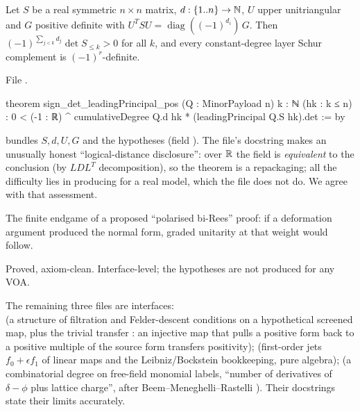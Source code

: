 \begin{theorem}\label{l19:thm:payload}
Let $S$ be a real symmetric $n\times n$ matrix, $d:\{1..n\}\to{\mathbb{N}}$, $U$ upper unitriangular and $G$ positive
definite with $U^TSU = \operatorname{diag}((-1)^{d_i})\,G$. Then $(-1)^{\sum_{j<k}d_j}\det S_{\le k}>0$ for all
$k$, and every constant-degree layer Schur complement is $(-1)^r$-definite.
\end{theorem}

\noindent File .
\begin{leancode}
theorem sign_det_leadingPrincipal_pos (Q : MinorPayload n) {k : ℕ}
    (hk : k ≤ n) :
    0 < (-1 : ℝ) ^ cumulativeDegree Q.d hk
        * (leadingPrincipal Q.S hk).det := by
\end{leancode}

\begin{dictionary}
 bundles $S,d,U,G$ and the hypotheses (field ).
The file's docstring makes an unusually honest ``logical-distance disclosure'': over $\mathbb{R}$ the field
 is \emph{equivalent} to the conclusion (by $LDL^T$ decomposition), so the theorem is a
repackaging; all the difficulty lies in producing  for a real model, which the file does not do.
We agree with that assessment.
\end{dictionary}

\begin{physics}
The finite endgame of a proposed ``polarised bi-Rees'' proof: if a deformation argument produced the normal
form, graded unitarity at that weight would follow.
\end{physics}

\begin{status}
Proved, axiom-clean. Interface-level; the hypotheses are not produced for any VOA.
\end{status}

The remaining three files are interfaces:\\  (a structure
 of filtration and Felder-descent conditions on a hypothetical screened map,
plus the trivial transfer : an injective map that pulls a positive form back
to a positive multiple of the source form transfers positivity); 
(first-order jets $f_0+\epsilon f_1$ of linear maps and the Leibniz/Bockstein bookkeeping, pure algebra);
 (a combinatorial degree  on free-field monomial labels,
``number of derivatives of $\delta-\phi$ plus lattice charge'', after Beem--Meneghelli--Rastelli%
). Their docstrings state their limits accurately.

